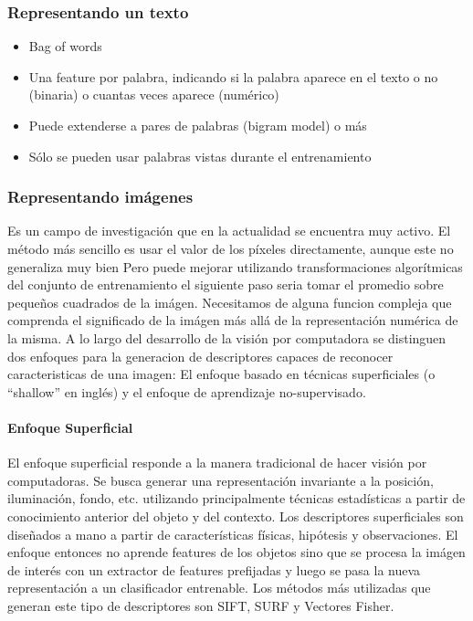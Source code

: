 \documentclass[a4paper,12pt,spanish]{book}
\begin{document}
      \subsubsection{Representando un texto}
	\begin{itemize}
	  \item Bag of words
	  \item Una feature por palabra, indicando si la palabra aparece en el texto o no (binaria) o cuantas veces aparece (numérico)
	  \item Puede extenderse a pares de palabras (bigram model) o más
	  \item Sólo se pueden usar palabras vistas durante el entrenamiento
	\end{itemize}
	\subsubsection{Representando imágenes}
	  Es un campo de investigación que en la actualidad se encuentra muy activo. El método más sencillo es usar el valor de los píxeles directamente, aunque este no generaliza muy bien
	  Pero puede mejorar utilizando transformaciones algorítmicas del conjunto de entrenamiento el siguiente paso seria tomar el promedio sobre pequeños cuadrados de la imágen.
	  Necesitamos de alguna funcion compleja que comprenda el significado de la imágen más allá de la representación numérica de la misma.
	  A lo largo del desarrollo de la visión por computadora se distinguen dos enfoques para la generacion de descriptores capaces de reconocer caracteristicas de una imagen: 
	  El enfoque basado en técnicas superficiales (o “shallow” en inglés) y el enfoque de aprendizaje no-supervisado.
	  \paragraph{Enfoque Superficial}
	    El enfoque superficial responde a la manera tradicional de hacer visión por computadoras. Se busca generar una representación invariante a la posición, iluminación, fondo,
	    etc. utilizando principalmente técnicas estadísticas a partir de conocimiento anterior del objeto y del contexto. Los descriptores superficiales son diseñados a mano a 
	    partir de características físicas, hipótesis y observaciones. El enfoque entonces no aprende features de los objetos sino que se procesa la imágen de interés con un 
	    extractor de features prefijadas y luego se pasa la nueva representación a un clasificador entrenable. Los métodos más utilizadas que generan este tipo de descriptores son SIFT, SURF y Vectores Fisher.
\end{document}
